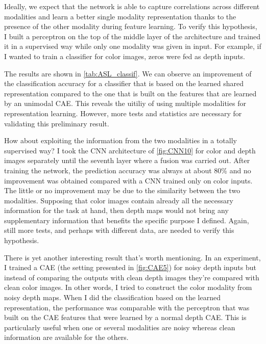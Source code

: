 Ideally, we expect that the network is able to capture correlations
across different modalities and learn a better single modality
representation thanks to the presence of the other modality
during feature learning. To verify this hypothesis, I built a perceptron
on the top of the middle layer of the architecture and trained it
in a supervised way while only one modality was given in input. For example,
if I wanted to train a classifier for color images, zeros were fed as
depth inputs.

The results are shown in \autoref{tab:ASL_classif}.
We can observe an improvement of the classification accuracy for a
classifier that is based on the learned shared representation 
compared to the one that is built on the features that are learned by
an unimodal CAE. This reveals the uitiliy of using multiple modalities
for representation learning. However, more tests and statistics
are necessary for validating this preliminary result.

How about exploiting the information from the two modalities in a
totally supervised way? I took the CNN architecture of \autoref{fig:CNN10}
for color and depth images separately until the seventh layer where
a fusion was carried out. After training the network, the prediction
accuracy was always at about 80\% and no improvement was obtained compared
with a CNN trained only on color inputs. The little or no improvement
may be due to the similarity between the two modalities. Supposing that
color images contain already all the necessary information for the task
at hand, then depth maps would not bring any supplementary information
that benefits the specific purpose I defined. Again, still more tests,
and perhaps with different data, are needed to verify this hypothesis.

There is yet another interesting result that's worth mentioning.
In an experiment, I trained a CAE (the setting presented in
\autoref{fig:CAE5}) for noisy depth inputs but instead of comparing
the outputs with clean depth images they're compared with clean
color images. In other words, I tried to construct the color modality from
noisy depth maps. When I did the classification based on the learned
representation, the performance was comparable with the perceptron
that was built on the CAE features that were learned by a normal
depth CAE. This is particularly useful when one or several
modalities are noisy whereas clean information are available for the others.

